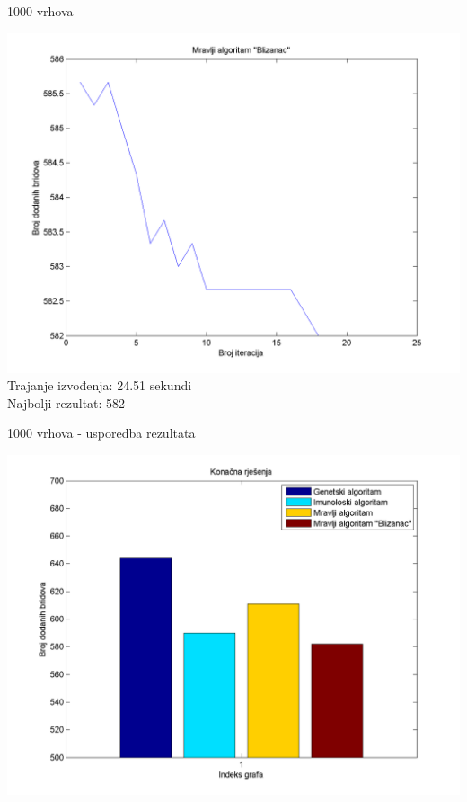 \documentclass{beamer}
\begin{document}
\begin{frame}{1000 vrhova}
\begin{center}
\includegraphics[scale = 0.4]{MrBl1000.png}\\
Trajanje izvođenja: 24.51 sekundi\\
Najbolji rezultat: 582\\
\end{center}
\end{frame}


\begin{frame}{1000 vrhova - usporedba rezultata}
\begin{center}
\includegraphics[scale = 0.45]{Zajedno1000.png}\\
\end{center}
\end{frame}
\end{document}
